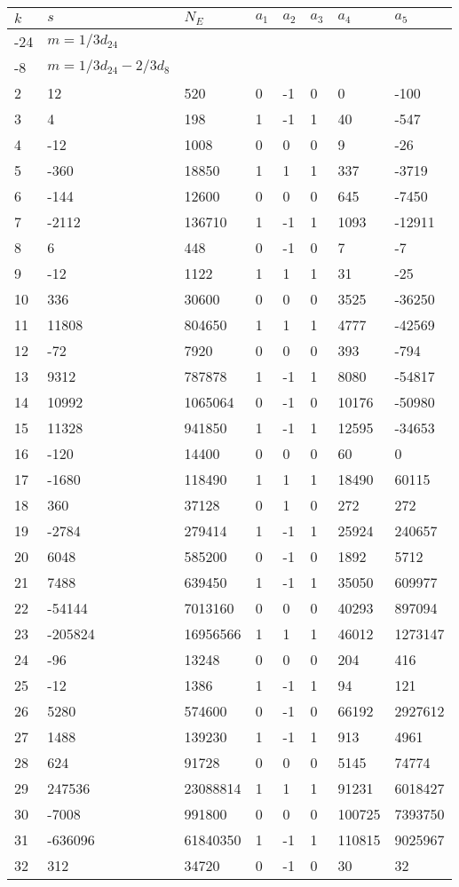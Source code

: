 \documentclass{amsart}
\begin{document}
\begin{longtable}{|l|l|l|lllll|}
\hline
$k$ & $s$ & $N_E$ & $a_1$ & $a_2$ & $a_3$ & $a_4$ & $a_5$\\
\hline
-24&$m=1/3d_{24}$&&\multicolumn{5}{c|}{}\\
-8&$m=1/3d_{24}-2/3d_{8}$&&\multicolumn{5}{c|}{}\\
2&12&520&0&-1&0&0&-100\\
3&4&198&1&-1&1&40&-547\\
4&-12&1008&0&0&0&9&-26\\
5&-360&18850&1&1&1&337&-3719\\
6&-144&12600&0&0&0&645&-7450\\
7&-2112&136710&1&-1&1&1093&-12911\\
8&6&448&0&-1&0&7&-7\\
9&-12&1122&1&1&1&31&-25\\
10&336&30600&0&0&0&3525&-36250\\
11&11808&804650&1&1&1&4777&-42569\\
12&-72&7920&0&0&0&393&-794\\
13&9312&787878&1&-1&1&8080&-54817\\
14&10992&1065064&0&-1&0&10176&-50980\\
15&11328&941850&1&-1&1&12595&-34653\\
16&-120&14400&0&0&0&60&0\\
17&-1680&118490&1&1&1&18490&60115\\
18&360&37128&0&1&0&272&272\\
19&-2784&279414&1&-1&1&25924&240657\\
20&6048&585200&0&-1&0&1892&5712\\
21&7488&639450&1&-1&1&35050&609977\\
22&-54144&7013160&0&0&0&40293&897094\\
23&-205824&16956566&1&1&1&46012&1273147\\
24&-96&13248&0&0&0&204&416\\
25&-12&1386&1&-1&1&94&121\\
26&5280&574600&0&-1&0&66192&2927612\\
27&1488&139230&1&-1&1&913&4961\\
28&624&91728&0&0&0&5145&74774\\
29&247536&23088814&1&1&1&91231&6018427\\
30&-7008&991800&0&0&0&100725&7393750\\
31&-636096&61840350&1&-1&1&110815&9025967\\
32&312&34720&0&-1&0&30&32\\

\end{longtable}
\end{document}
